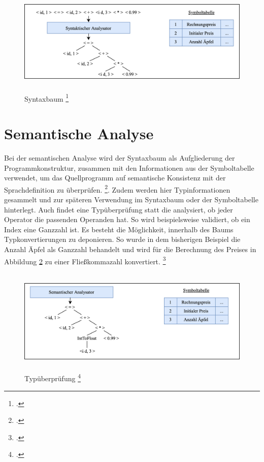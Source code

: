 \begin{figure}[!ht]
 \includegraphics[width=14.5cm,height=5cm]{Images/Compiler/ParserResult.png}
 \caption[Syntaxbaum]{Syntaxbaum \protect\footcite{Ullmann2008} }
 \label{fig:ParserResult}
\end{figure}
\section{Semantische Analyse}

Bei der semantischen Analyse wird der Syntaxbaum    als Aufgliederung der Programmkonstruktur,  zusammen mit den Informationen aus der Symboltabelle verwendet,  um das Quellprogramm auf semantische Konsistenz mit der Sprachdefinition zu überprüfen. \footcite[Vgl.][S. 157]{Wilhelm2012}.  Zudem werden hier Typinformationen gesammelt und zur späteren Verwendung im Syntaxbaum oder der Symboltabelle hinterlegt.  Auch findet eine Typüberprüfung statt die analysiert, ob jeder Operator die passenden Operanden hat.  So wird beispielsweise validiert,  ob ein Index eine Ganzzahl ist.  Es besteht die Möglichkeit, innerhalb des Baums Typkonvertierungen zu deponieren.  So wurde in dem bisherigen Beispiel die Anzahl Äpfel als Ganzzahl behandelt und wird für die Berechnung des Preises in Abbildung \ref{fig:Typ} zu einer Fließkommazahl konvertiert. \footcite[Vgl.][S. 9ff]{Ullmann2008}

\begin{figure}[!ht]
 \includegraphics[width=14.5cm,height=5cm]{Images/Compiler/Type.png}
 \caption[Typüberprüfung]{Typüberprüfung \protect\footcite{Ullmann2008} }
 \label{fig:Typ}
\end{figure}
